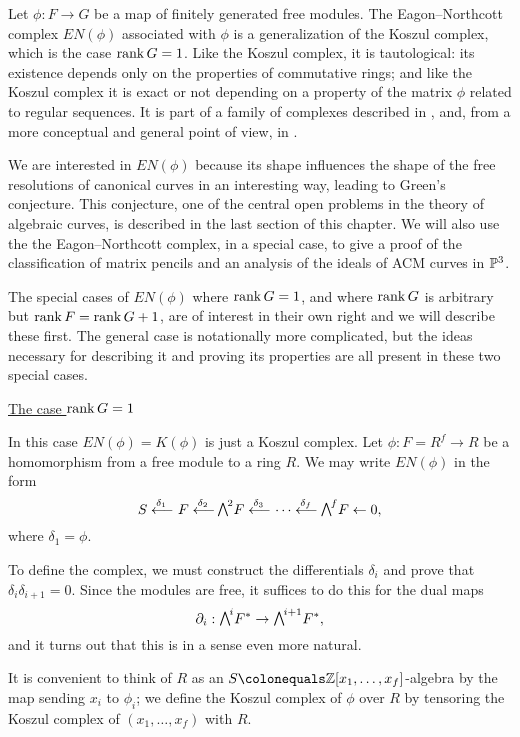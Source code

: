 Let $\phi: F\to G$ be a map of finitely generated free modules. The Eagon--Northcott complex $EN(\phi)$ \cite{MR0142592} associated with $\phi$
%
%
is a generalization of the Koszul complex, which is the case $\rank G =
\index{Koszul complex}%
1$. Like the Koszul complex,
it is tautological: its existence depends only on the properties
of commutative rings; and like the Koszul complex it is exact or
not depending on a property of the matrix $\phi$ related to regular
sequences. It is part of a family of complexes described in
\cite[Appendix A2]{Eisenbud1995}, and, from a more conceptual and general
point of view, in \cite{Weyman-book}.

We
are interested in $EN(\phi)$ because its shape
influences the shape of the free resolutions of canonical curves in an
interesting way,
leading to Green's conjecture. This conjecture, one of the central open
problems in the theory of algebraic curves, is described in the last
section of this chapter. We will also use the the Eagon--Northcott
complex, in a special case, to give a proof of the classification of
matrix pencils and an analysis of the ideals of ACM curves in ${\mathbb P}^{3}$.

The special cases of $EN(\phi)$ where $\operatorname{rank} G = 1$, and where
$\operatorname{rank} G$ is arbitrary but $\operatorname{rank} F = \operatorname{rank} G + 1$, are of interest in their
own right and we will describe these first. The general case
is notationally more complicated, but the  ideas necessary for
describing it and proving its properties
 are all
present in these two special cases.

\smallbreak
\noindent
\underline{The case $\operatorname{rank} G = 1$}
\smallbreak

In this case $EN(\phi) = K(\phi)$ is just a
 Koszul complex. Let $\phi:F = R^{f}\to R$ be a homomorphism from
a free module to a ring $R$. We may write $EN(\phi)$ in the form
$$
S \luto{\,\delta_{1}} \!F \luto{\,\delta_{2}}\!\! \mwedge^{2}F
\luto{\,\delta_{3}} \!\cdots \luto{\,\delta_{f}}\!\!\mwedge^{f}F\leftarrow 0, 
$$
where $\delta_{1} = \phi$.

To define the complex, we must construct the differentials $\delta_{i}$
and prove that
$\delta_{i}\delta_{i+1} = 0$. Since the modules are free, it suffices
to do this for the
dual maps
$$
\partial_{i}: \mwedge^{i}F^{*} \to \mwedge^{i+1}F^{*},
$$
and it turns out that this is in a sense even more natural.

It is convenient to think of $R$ as an $S \colonequals  \ZZ[x_{1},\dots,
x_{f}]$-algebra by the map sending
$x_{i}$ to $\phi_{i}$; we  define the Koszul complex of $\phi$ over $R$
%
by tensoring
the Koszul complex of $(x_{1}, \dots, x_{f})$ with $R$.

